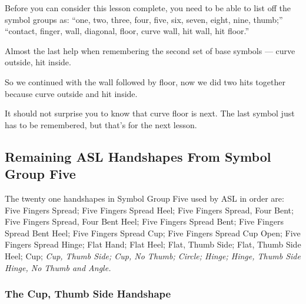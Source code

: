 \documentclass{article}
\begin{document}
Before you can consider this lesson complete, you need to be able to list off the symbol groups as:
``one, two, three, four, five, six, seven, eight, nine, thumb;''
``contact, finger, wall, diagonal, floor, curve wall, hit wall, hit floor.''

Almost the last help when remembering the second set of base symbols --- curve outside, hit inside.

So we continued with the wall followed by floor, now we did two hits together because curve outside and hit inside.

It should not surprise you to know that curve floor is next.
The last symbol just has to be remembered, but that's for the next lesson.

\subsection{Remaining ASL Handshapes From Symbol Group Five}

The twenty one handshapes in Symbol Group Five used by ASL in order are:
Five Fingers Spread;
Five Fingers Spread Heel;
Five Fingers Spread, Four Bent;
Five Fingers Spread, Four Bent Heel;
Five Fingers Spread Bent;
Five Fingers Spread Bent Heel;
Five Fingers Spread Cup;
Five Fingers Spread Cup Open;
Five Fingers Spread Hinge;
Flat Hand;
Flat Heel;
Flat, Thumb Side;
Flat, Thumb Side Heel;
Cup;
{\it
Cup, Thumb Side;
Cup, No Thumb;
Circle;
Hinge;
Hinge, Thumb Side
Hinge, No Thumb
and Angle.
}

\subsubsection{The Cup, Thumb Side Handshape}
\end{document}
